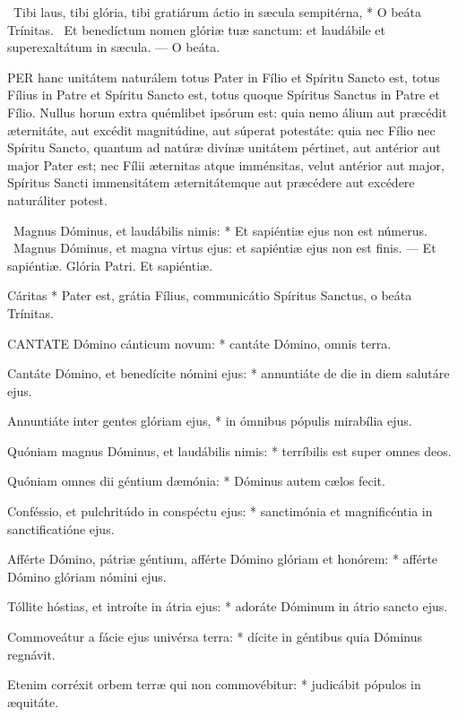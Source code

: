 \R\ Tibi laus, tibi glória, tibi gratiárum áctio in sæcula sempitérna, * O beáta Trínitas. \V\ Et benedíctum nomen glóriæ tuæ sanctum: et laudábile et superexaltátum in sæcula. --- O beáta.


\lettrine[lines=2]{P}{ER} hanc unitátem naturálem totus Pater in Fílio et Spíritu Sancto est, totus Fílius in Patre et Spíritu Sancto est, totus quoque Spíritus Sanctus in Patre et Fílio. Nullus horum extra quémlibet ipsórum est: quia nemo álium aut præcédit æternitáte, aut excédit magnitúdine, aut súperat potestáte: quia nec Fílio nec Spíritu Sancto, quantum ad natúræ divínæ unitátem pértinet, aut antérior aut major Pater est; nec Fílii æternitas atque imménsitas, velut antérior aut major, Spíritus Sancti immensitátem æternitátemque aut præcédere aut excédere naturáliter potest.

\R\ Magnus Dóminus, et laudábilis nimis: * Et sapiéntiæ ejus non est númerus. \V\ Magnus Dóminus, et magna virtus ejus: et sapiéntiæ ejus non est finis. --- Et sapiéntiæ. Glória Patri. Et sapiéntiæ.


 Cáritas * Pater est, grátia Fílius, communicátio Spíritus Sanctus, o beáta Trínitas.


\lettrine[lines=2]{C}{ANTATE} Dómino cánticum novum: * cantáte Dómino, omnis terra.

Cantáte Dómino, et benedícite nómini ejus: * annuntiáte de die in diem salutáre ejus.

Annuntiáte inter gentes glóriam ejus, * in ómnibus pópulis mirabília ejus.

Quóniam magnus Dóminus, et laudábilis nimis: * terríbilis est super omnes deos.

Quóniam omnes dii géntium dæmónia: * Dóminus autem cælos fecit.

Conféssio, et pulchritúdo in conspéctu ejus: * sanctimónia et magnificéntia in sanctificatióne ejus.

Afférte Dómino, pátriæ géntium, afférte Dómino glóriam et honórem: * afférte Dómino glóriam nómini ejus.

Tóllite hóstias, et introíte in átria ejus: * adoráte Dóminum in átrio sancto ejus.

Commoveátur a fácie ejus univérsa terra: * dícite in géntibus quia Dóminus regnávit.

Etenim corréxit orbem terræ qui non commovébitur: * judicábit pópulos in æquitáte.

